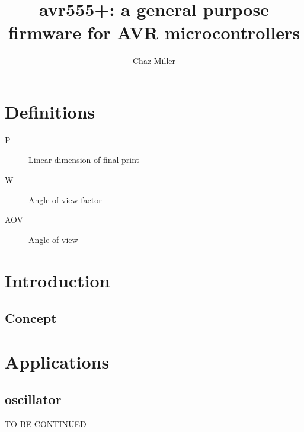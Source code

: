 \documentclass[dvips,12pt]{article}
\title{avr555+: a general purpose firmware for AVR microcontrollers}
\author{Chaz Miller}
\begin{document}
\frenchspacing
\maketitle
\tableofcontents


\section{Definitions}
\begin{adjustwidth}{2.5em}{0pt}
\begin{description}
    \item[P] Linear dimension of final print 
    \item[W] Angle-of-view factor 
    \item[AOV] Angle of view
\end{description}
\end{adjustwidth}

\section{Introduction}

\subsection{Concept}
\section{Applications}
\subsection{oscillator}


\vspace{2cm}
\centering
TO BE CONTINUED
\appendix
\end{document}

